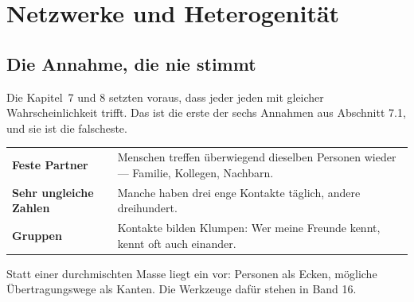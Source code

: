 \chapter{Netzwerke und Heterogenität}

\section{Die Annahme, die nie stimmt}

Die Kapitel~7 und 8 setzten voraus, dass jeder jeden mit gleicher Wahrscheinlichkeit trifft. Das ist die erste der sechs Annahmen aus Abschnitt 7.1, und sie ist die falscheste.

\begin{merksatz}
\begin{center}
{\small
\renewcommand{\arraystretch}{1.5}
\begin{tabular}{@{}P{2.6cm}P{6.0cm}@{}}
\toprule
\textbf{Feste Partner} & Menschen treffen überwiegend dieselben Personen wieder --- Familie, Kollegen, Nachbarn.\\
\textbf{Sehr ungleiche Zahlen} & Manche haben drei enge Kontakte täglich, andere dreihundert.\\
\textbf{Gruppen} & Kontakte bilden Klumpen: Wer meine Freunde kennt, kennt oft auch einander.\\
\bottomrule
\end{tabular}}
\end{center}

\begin{center}
\begin{minipage}{0.9\textwidth}
Statt einer durchmischten Masse liegt ein  vor: Personen als Ecken, mögliche Übertragungswege als Kanten. Die Werkzeuge dafür stehen in Band 16.
\end{minipage}
\end{center}


\end{merksatz}

